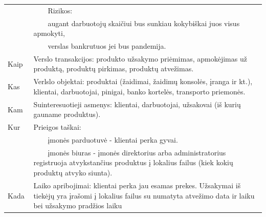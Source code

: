 \documentclass{VUMIFPSkursinis}
\newcommand{\tabitem}{~~\llap{\textbullet}~~}
\newcommand{\tabitemd}{~~\llap{\textopenbullet}~~}
\begin{document}
\begin{center}
\begin{table}[ht]
\begin{tabular}{| p{0.1\linewidth} | p{0.9\linewidth }|}
		&\hspace{4mm}\tabitem Rizikos: \\
		&\hspace{8mm}\tabitemd augant darbuotojų skaičiui bus sunkiau kokybiškai juos visus apmokyti, \\
		&\hspace{8mm}\tabitemd verslas bankrutuos jei bus pandemija. \\ \hline
	Kaip 	&  Verslo transakcijos: produkto užsakymo priėmimas, apmokėjimas už produktą, produktų pirkimas, produktų atvežimas. \\ \hline
	Kas 	& Verlslo objektai: produktai (žaidimai, žaidimų konsolės, įranga ir kt.), klientai, darbuotojai, pinigai, banko kortelės, transporto priemonės. \\ \hline
	Kam 	& Suinteresuotieji asmenys: klientai, darbuotojai, užsakovai (iš kurių gauname produktus). \\ \hline
	Kur 	& Prieigos taškai: \\
		&\hspace{4mm}\tabitem įmonės parduotuvė - klientai perka gyvai.\\ 
		&\hspace{4mm}\tabitem įmonės biuras - įmonės direktorius arba administratorius registruoja atvykstančius produktus į lokalius failus (kiek kokių produktų atvyko siunta). \\ \hline
	Kada 	& Laiko apribojimai: klientai perka jau esamas prekes. Užsakymai iš tiekėjų yra įrašomi į lokalius failus su numatyta atvežimo data ir laiku bei užsakymo pradžios laiku\\ \hline				\end{tabular}
\end{table}	
\end{center}
\newpage
\end{document}
